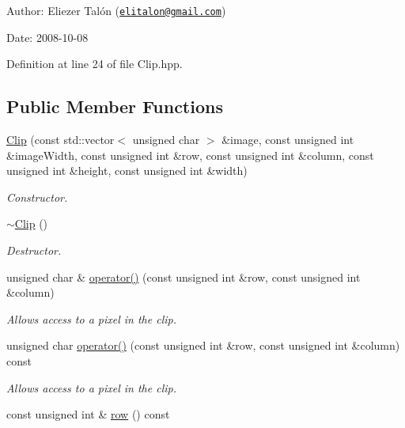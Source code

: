 \begin{Desc}
\item[Author:]Eliezer Talón (\href{mailto:elitalon@gmail.com}{\tt elitalon@gmail.com}) \end{Desc}
\begin{Desc}
\item[Date:]2008-10-08 \end{Desc}


Definition at line 24 of file Clip.hpp.\subsection*{Public Member Functions}
\begin{CompactItemize}
\item 
\hyperlink{class_clip_6264e0334483ad8e0631842a18ac5bc9}{Clip} (const std::vector$<$ unsigned char $>$ \&image, const unsigned int \&imageWidth, const unsigned int \&row, const unsigned int \&column, const unsigned int \&height, const unsigned int \&width)
\begin{CompactList}\small\item\em Constructor. \item\end{CompactList}\item 
\hyperlink{class_clip_88647ed65e3482b5e0533ec98667b0fa}{$\sim$Clip} ()
\begin{CompactList}\small\item\em Destructor. \item\end{CompactList}\item 
unsigned char \& \hyperlink{class_clip_0f80c2b0f0f177fe9c780c93596f77be}{operator()} (const unsigned int \&row, const unsigned int \&column)
\begin{CompactList}\small\item\em Allows access to a pixel in the clip. \item\end{CompactList}\item 
unsigned char \hyperlink{class_clip_16b24276181affc5086cb4fe83269fb8}{operator()} (const unsigned int \&row, const unsigned int \&column) const 
\begin{CompactList}\small\item\em Allows access to a pixel in the clip. \item\end{CompactList}\item 
const unsigned int \& \hyperlink{class_clip_1a1d1fd626d1325f0f2b9184de4c89b8}{row} () const 

\end{CompactItemize}
